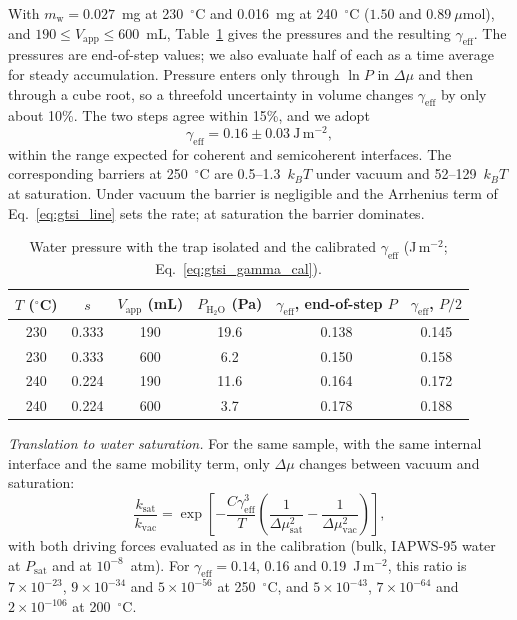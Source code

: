 With $m_{\mathrm{w}} = 0.027$~mg at 230~$^\circ$C and 0.016~mg at 240~$^\circ$C ($1.50$ and
$0.89~\mu$mol), and $190\le V_{\mathrm{app}}\le600$~mL, Table~\ref{tab:gtsi_gamma} gives the pressures
and the resulting $\gamma_{\mathrm{eff}}$. The pressures are end-of-step values; we also evaluate half
of each as a time average for steady accumulation. Pressure enters only through $\ln P$ in
$\Delta\mu$ and then through a cube root, so a threefold uncertainty in volume changes
$\gamma_{\mathrm{eff}}$ by only about 10\%. The two steps agree within 15\%, and we adopt
\begin{equation}
  \gamma_{\mathrm{eff}} = 0.16\pm0.03~\mathrm{J\,m^{-2}} ,
\end{equation}
within the range expected for coherent and semicoherent interfaces. The corresponding barriers at
250~$^\circ$C are 0.5--1.3~$k_BT$ under vacuum and 52--129~$k_BT$ at saturation. Under vacuum the
barrier is negligible and the Arrhenius term of Eq.~\eqref{eq:gtsi_line} sets the rate; at saturation
the barrier dominates.

\begin{table}[htbp]
  \centering
  \caption{Water pressure with the trap isolated and the calibrated $\gamma_{\mathrm{eff}}$ (J\,m$^{-2}$; Eq.~\eqref{eq:gtsi_gamma_cal}).}
  \label{tab:gtsi_gamma}
  \begin{tabular}{cccccc}
    \hline
    $T$ ($^\circ$C) & $s$ & $V_{\mathrm{app}}$ (mL) & $P_{\mathrm{H_2O}}$ (Pa) & $\gamma_{\mathrm{eff}}$, end-of-step $P$ & $\gamma_{\mathrm{eff}}$, $P/2$ \\
    \hline
    230 & 0.333 & 190 & 19.6 & 0.138 & 0.145 \\
    230 & 0.333 & 600 & 6.2  & 0.150 & 0.158 \\
    240 & 0.224 & 190 & 11.6 & 0.164 & 0.172 \\
    240 & 0.224 & 600 & 3.7  & 0.178 & 0.188 \\
    \hline
  \end{tabular}
\end{table}

\textit{Translation to water saturation.} For the same sample, with the same internal interface
and the same mobility term, only $\Delta\mu$ changes between vacuum and saturation:
\begin{equation}
  \frac{k_{\mathrm{sat}}}{k_{\mathrm{vac}}} = \exp\!\left[-\frac{C\gamma_{\mathrm{eff}}^{3}}{T}\left(\frac{1}{\Delta\mu_{\mathrm{sat}}^{2}} - \frac{1}{\Delta\mu_{\mathrm{vac}}^{2}}\right)\right],
  \label{eq:gtsi_translate}
\end{equation}
with both driving forces evaluated as in the calibration (bulk, IAPWS-95 water at $P_{\mathrm{sat}}$ and
at $10^{-8}$~atm). For $\gamma_{\mathrm{eff}} = 0.14$, 0.16 and 0.19~J\,m$^{-2}$, this ratio is
$7\times10^{-23}$, $9\times10^{-34}$ and $5\times10^{-56}$ at 250~$^\circ$C, and $5\times10^{-43}$,
$7\times10^{-64}$ and $2\times10^{-106}$ at 200~$^\circ$C.

